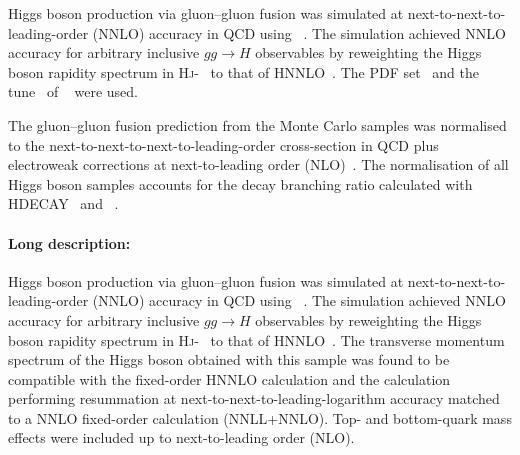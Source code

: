 Higgs boson production via gluon--gluon fusion was simulated at next-to-next-to-leading-order (NNLO) accuracy in 
QCD using \POWHEGBOX[v2]~\cite{Hamilton:2013fea,Hamilton:2015nsa,Alioli:2010xd,Nason:2004rx,Frixione:2007vw}. 
The simulation achieved NNLO accuracy for arbitrary inclusive $gg\to H$ observables by reweighting the Higgs boson 
rapidity spectrum in \textsc{Hj}-\MINLO~\cite{Hamilton:2012np,Campbell:2012am,Hamilton:2012rf} to that of HNNLO~\cite{Catani:2007vq}.
The \PDFforLHC[15nnlo] PDF set~\cite{Butterworth:2015oua} and the \AZNLO tune~\cite{STDM-2012-23} 
of \PYTHIA[8]~\cite{Sjostrand:2014zea} were used.

The gluon--gluon fusion prediction from the Monte Carlo samples was normalised to the 
next-to-next-to-next-to-leading-order cross-section in QCD plus electroweak corrections 
at next-to-leading order 
(NLO)~\cite{deFlorian:2016spz,Anastasiou:2016cez,Anastasiou:2015ema,Dulat:2018rbf,Harlander:2009mq,Harlander:2009bw,Harlander:2009my,Pak:2009dg,Actis:2008ug,Actis:2008ts,Bonetti:2018ukf,Bonetti:2018ukf}. 
The normalisation of all Higgs boson
samples accounts for the decay branching ratio calculated with HDECAY~\cite{Djouadi:1997yw,Spira:1997dg,Djouadi:2006bz}
and \PROPHECY~\cite{Bredenstein:2006ha,Bredenstein:2006rh,Bredenstein:2006nk}.


\paragraph{Long description:}

Higgs boson production via gluon--gluon fusion was simulated at next-to-next-to-leading-order (NNLO) accuracy in QCD using 
\POWHEGBOX[v2]~\cite{Hamilton:2013fea,Hamilton:2015nsa,Alioli:2010xd,Nason:2004rx,Frixione:2007vw}. The simulation achieved NNLO
accuracy for arbitrary inclusive $gg\to H$ observables by reweighting the Higgs boson rapidity spectrum 
in \textsc{Hj}-\MINLO~\cite{Hamilton:2012np,Campbell:2012am,Hamilton:2012rf} to that of HNNLO~\cite{Catani:2007vq}. The transverse momentum
spectrum of the Higgs boson obtained with this sample was found to be compatible with the fixed-order HNNLO calculation and the
\HRES[2.3] calculation~\cite{Bozzi:2005wk,deFlorian:2011xf} performing resummation at next-to-next-to-leading-logarithm accuracy
matched to a NNLO fixed-order calculation (NNLL+NNLO). 
Top- and bottom-quark mass effects were included up to next-to-leading order (NLO).

